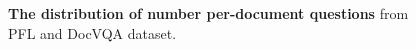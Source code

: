 \begin{figure}
    \centering
\caption{\textbf{The distribution of number per-document questions} from PFL and DocVQA dataset.}
\label{fig:questions_per_document}
\end{figure}

